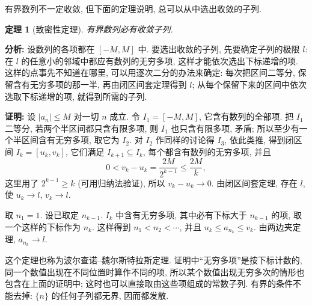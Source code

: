 \documentclass[UTF8,openany]{ctexbook}
\theoremstyle{chinesetextbook}
\newtheorem{theorem}{定理}[section]
\newenvironment{cnproof}{\par\indent\textbf{证明:} \ignorespaces}{\par}
\begin{document}
有界数列不一定收敛, 但下面的定理说明, 总可以从中选出收敛的子列.
\begin{theorem}[致密性定理]
有界数列必有收敛子列.
\end{theorem}
\par\indent\textbf{分析:} 设数列的各项都在 $[-M,M]$ 中. 要选出收敛的子列, 先要确定子列的极限 $l$: 在 $l$ 的任意小的邻域中都应有数列的无穷多项, 这样才能依次选出下标递增的项. 这样的点事先不知道在哪里, 可以用逐次二分的办法来确定: 每次把区间二等分, 保留含有无穷多项的那一半, 再由闭区间套定理得到 $l$; 从每个保留下来的区间中依次选取下标递增的项, 就得到所需的子列.
\begin{cnproof}
设 $|a_n|\le M$ 对一切 $n$ 成立. 令 $I_1=[-M,M]$, 它含有数列的全部项. 把 $I_1$ 二等分, 若两个半区间都只含有限多项, 则 $I_1$ 也只含有限多项, 矛盾; 所以至少有一个半区间含有无穷多项, 取它为 $I_2$. 对 $I_2$ 作同样的讨论得 $I_3$, 依此类推, 得到闭区间 $I_k=[u_k,v_k]$, 它们满足 $I_{k+1}\subseteq I_k$, 每个都含有数列的无穷多项, 并且
\[
0<v_k-u_k=\frac{2M}{2^{k-1}}\le\frac{2M}k,
\]
这里用了 $2^{k-1}\ge k$ (可用归纳法验证), 所以 $v_k-u_k\to0$. 由闭区间套定理, 存在 $l$, 使 $u_k\to l$, $v_k\to l$.

取 $n_1=1$. 设已取定 $n_{k-1}$. $I_k$ 中含有无穷多项, 其中必有下标大于 $n_{k-1}$ 的项, 取一个这样的下标作为 $n_k$. 这样得到 $n_1<n_2<\cdots$, 并且 $u_k\le a_{n_k}\le v_k$. 由两边夹定理, $a_{n_k}\to l$.
\end{cnproof}
这个定理也称为波尔查诺--魏尔斯特拉斯定理. 证明中“无穷多项”是按下标计数的, 同一个数值出现在不同位置时算作不同的项, 所以某个数值出现无穷多次的情形也包含在上面的证明中; 这时也可以直接取由这些项组成的常数子列. 有界的条件不能去掉: $\{n\}$ 的任何子列都无界, 因而都发散.
\end{document}
